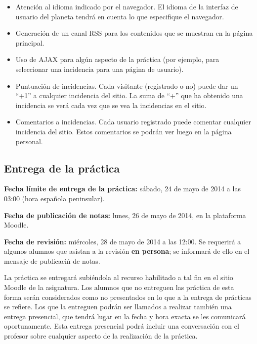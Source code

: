 \begin{itemize}
\item Atención al idioma indicado por el navegador. El idioma de la interfaz de usuario del planeta tendrá en cuenta lo que especifique el navegador.

\item Generación de un canal RSS para los contenidos que se muestran en la página principal.

\item Uso de AJAX para algún aspecto de la práctica (por ejemplo, para seleccionar una incidencia para una página de usuario).

\item Puntuación de incidencias. Cada visitante (registrado o no) puede dar un ``+1'' a cualquier incidencia del sitio. La suma de ``+'' que ha obtenido una incidencia se verá cada vez que se vea la incidencias en el sitio.

\item Comentarios a incidencias. Cada usuario registrado puede comentar cualquier incidencia del sitio. Estos comentarios se podrán ver luego en la página personal.

\end{itemize}


\subsection{Entrega de la práctica}

\textbf{Fecha límite de entrega de la práctica:} sábado, 24 de mayo de 2014 a las 03:00 (hora española peninsular).

\textbf{Fecha de publicación de notas:} lunes, 26 de mayo de 2014, en la plataforma Moodle.

\textbf{Fecha de revisión:} miércoles, 28 de mayo de 2014 a las 12:00. Se requerirá a algunos alumnos que asistan a la revisión {\bf en persona}; se informará de ello en el mensaje de publicaciń de notas.

La práctica se entregará subiéndola al recurso habilitado a tal fin en el sitio Moodle de la asignatura. Los alumnos que no entreguen las práctica de esta forma serán considerados como no presentados en lo que a la entrega de prácticas se refiere. Los que la entreguen podrán ser llamados a realizar también una entrega presencial, que tendrá lugar en la fecha y hora exacta se les comunicará oportunamente. Esta entrega presencial podrá incluir una conversación con el profesor sobre cualquier aspecto de la realización de la práctica.

